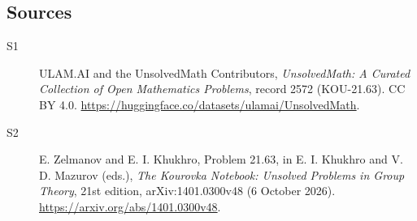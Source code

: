 \documentclass[11pt]{article}
\begin{document}
\subsection{Sources}
\begin{description}
\item[\hypertarget{source:2572:1}{S1}] ULAM.AI and the UnsolvedMath Contributors, \emph{UnsolvedMath: A Curated Collection of Open Mathematics Problems}, record 2572 (KOU-21.63). CC BY 4.0. \url{https://huggingface.co/datasets/ulamai/UnsolvedMath}.
\item[\hypertarget{source:2572:2}{S2}] E. Zelmanov and E. I. Khukhro, Problem 21.63, in E. I. Khukhro and V. D. Mazurov (eds.), \emph{The Kourovka Notebook: Unsolved Problems in Group Theory}, 21st edition, arXiv:1401.0300v48 (6 October 2026). \url{https://arxiv.org/abs/1401.0300v48}.
\end{description}
\label{end:2572}
\end{document}
